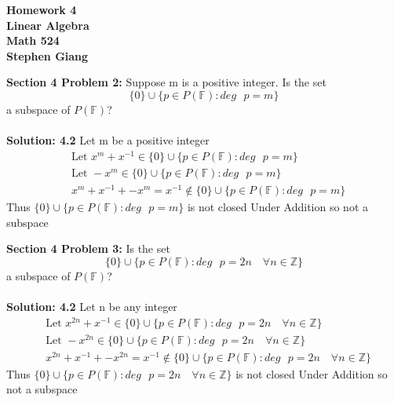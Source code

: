 \documentclass[12pt]{article}
\begin{document}
	
	\begin{center}
		\textbf{Homework 4} \\
		\textbf{Linear Algebra} \\
		\textbf{Math 524} \\
		\textbf{Stephen Giang} \\
	\end{center}

\noindent \textbf{Section 4 Problem 2: } Suppose m is a positive integer. Is the set
$$ \{0\}\cup\{p \in P(\mathbb{F}): deg \text{ } p = m\} $$ a subspace of $P(\mathbb{F})$?
\\ \\
\noindent \textbf{Solution: 4.2} Let m be a positive integer
	\begin{align*}
		&\text{Let } x^m + x^{-1} \in \{0\}\cup\{p \in P(\mathbb{F}): deg \text{ } p = m\} \\
		&\text{Let } -x^m \in \{0\}\cup\{p \in P(\mathbb{F}): deg \text{ } p = m\} \\
		& x^m + x^{-1} + -x^m = x^{-1} \not \in \{0\}\cup\{p \in P(\mathbb{F}): deg \text{ } p = m\}
	\end{align*}
Thus $\{0\}\cup\{p \in P(\mathbb{F}): deg \text{ } p = m\}$	is not closed Under Addition so not a subspace

\vspace{\baselineskip}
\vspace{\baselineskip}
\vspace{\baselineskip}

\noindent \textbf{Section 4 Problem 3: } Is the set
$$ \{0\}\cup\{p \in P(\mathbb{F}): deg \text{ } p = 2n \quad \forall n \in \mathbb{Z}\} $$ a subspace of $P(\mathbb{F})$?
\\ \\
\noindent \textbf{Solution: 4.2} Let n be any integer
\begin{align*}
&\text{Let } x^{2n} + x^{-1} \in \{0\}\cup\{p \in P(\mathbb{F}): deg \text{ } p = 2n \quad \forall n \in \mathbb{Z}\} \\
&\text{Let } -x^{2n} \in \{0\}\cup\{p \in P(\mathbb{F}): deg \text{ } p = 2n \quad \forall n \in \mathbb{Z}\} \\
& x^{2n} + x^{-1} + -x^{2n} = x^{-1} \not \in \{0\}\cup\{p \in P(\mathbb{F}): deg \text{ } p = 2n \quad \forall n \in \mathbb{Z}\}
\end{align*}
Thus $\{0\}\cup\{p \in P(\mathbb{F}): deg \text{ } p = 2n \quad \forall n \in \mathbb{Z}\}$	is not closed Under Addition so not a subspace
\end{document}
